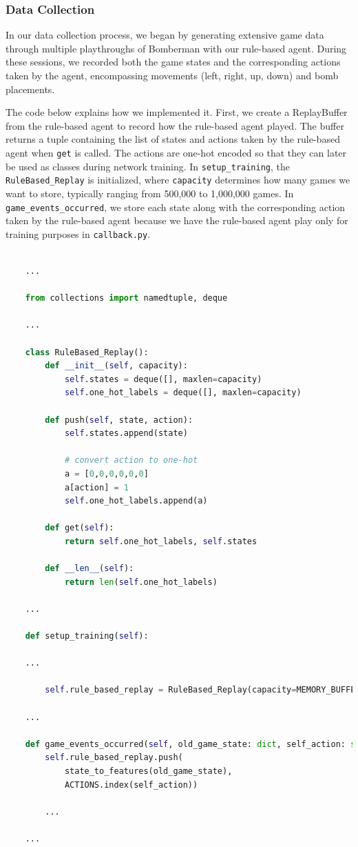 \subsubsection{Data Collection}

In our data collection process, we began by generating extensive game data through multiple playthroughs of Bomberman with 
our rule-based agent. During these sessions, we recorded both the game states and the corresponding actions taken by the agent, 
encompassing movements (left, right, up, down) and bomb placements.

The code below explains how we implemented it. First, we create a ReplayBuffer~\cite{Onl:replaybuff} from the rule-based agent 
to record how the rule-based agent played. The buffer returns a tuple containing the list of states and actions 
taken by the rule-based agent when \verb|get| is called. The actions are one-hot encoded so that they can later be used as 
classes during network training. In \verb|setup_training|, the \verb|RuleBased_Replay| is initialized, where \verb|capacity| determines 
how many games we want to store, typically ranging from 500,000 to 1,000,000 games. In \verb|game_events_occurred|, 
we store each state along with the corresponding action taken by the rule-based agent because we have the 
rule-based agent play only for training purposes in \verb|callback.py|.

\begin{lstlisting}[language=Python]
    
    ...

    from collections import namedtuple, deque

    ...

    class RuleBased_Replay():
        def __init__(self, capacity):
            self.states = deque([], maxlen=capacity)
            self.one_hot_labels = deque([], maxlen=capacity)

        def push(self, state, action):
            self.states.append(state)

            # convert action to one-hot
            a = [0,0,0,0,0,0]
            a[action] = 1
            self.one_hot_labels.append(a)

        def get(self):
            return self.one_hot_labels, self.states

        def __len__(self):
            return len(self.one_hot_labels)
        
    ...

    def setup_training(self):

    ...

        self.rule_based_replay = RuleBased_Replay(capacity=MEMORY_BUFFER)
    
    ...

    def game_events_occurred(self, old_game_state: dict, self_action: str, new_game_state: dict, events: List[str]):
        self.rule_based_replay.push(
            state_to_features(old_game_state), 
            ACTIONS.index(self_action))
        
        ...
    
    ...
    
\end{lstlisting}

